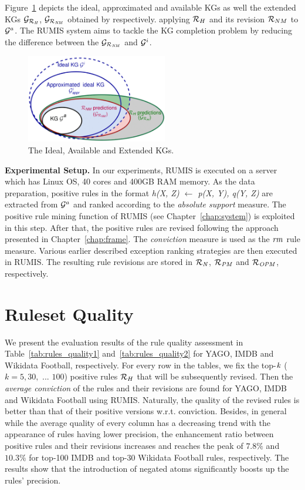Figure~\ref{fig:venn} depicts the ideal, approximated and available KGs as well the extended KGs $\mathcal{G}_{\mathcal{R}_{\mathit{H}}}$, $\mathcal{G}_{\mathcal{R}_{\mathit{NM}}}$ obtained by respectively. applying $\mathcal{R}_H$ and its revision $\mathcal{R}_{NM}$ to $\mathcal{G}^a$. The RUMIS system aims to tackle the KG completion problem by reducing the difference between the $\mathcal{G}_{\mathcal{R}_{\mathit{NM}}}$ and $ \mathcal{G}^i$.

\begin{figure}[ht]
\centering
\includegraphics[width=0.55\textwidth]{figures/big_pic_exp}
\caption{The Ideal, Available and Extended KGs.}
\label{fig:venn}
\end{figure}

\textbf{Experimental Setup.} In our experiments, RUMIS is executed on a server which has Linux OS, 40 cores and 400GB RAM memory. As the data preparation, positive rules in the format \textit{h(X, Z) $\leftarrow$ p(X, Y), q(Y, Z)} are extracted from $\mathcal{G}^a$ and ranked according to the \textit{absolute support} measure. The positive rule mining function of RUMIS (see Chapter~\ref{chap:system}) is exploited in this step. After that, the positive rules are revised following the approach presented in Chapter~\ref{chap:frame}. The \textit{conviction} measure is used as the $\mathit{rm}$ rule measure. Various earlier described exception ranking strategies are then executed in RUMIS. The resulting rule revisions are stored in $\mathit{\mathcal{R}_{N}}$, $\mathit{\mathcal{R}_{PM}}$ and $\mathit{\mathcal{R}_{OPM}}$, respectively.

\section{Ruleset Quality}

We present the evaluation results of the rule quality assessment in Table~\ref{tab:rules_quality1} and~\ref{tab:rules_quality2} for YAGO, IMDB and Wikidata Football, respectively. For every row in the tables, we fix the top-$\mathit{k}$ ($k=5,30,$ ... $100$) positive rules $\mathcal{R}_{H}$ that will be subsequently revised. Then the \textit{average conviction} of the rules and their revisions are found for YAGO, IMDB and Wikidata Football using RUMIS. Naturally, the quality of the revised rules is better than that of their positive versions w.r.t. conviction. Besides, in general while the average quality of every column has a decreasing trend with the appearance of rules having lower precision, the enhancement ratio between positive rules and their revisions increases and reaches the peak of $7.8\%$ and $10.3\%$ for top-100 IMDB and top-30 Wikidata Football rules, respectively. The results show that the introduction of negated atoms significantly boosts up the rules' precision.

